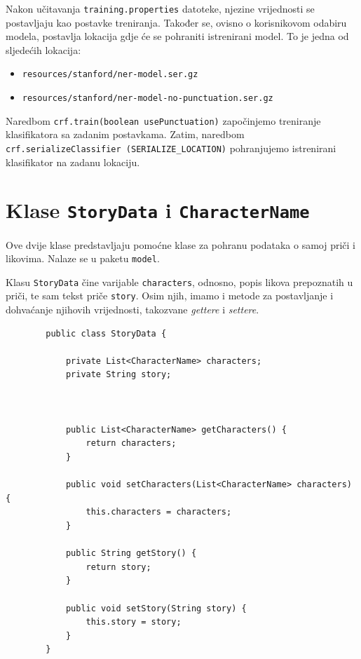 \documentclass[a4paper,twoside,12pt]{memoir} %
\newcommand{\ti}[1]{\textit{#1\/}}
\begin{document}
		Nakon učitavanja \texttt{training.properties} datoteke, njezine vrijednosti se postavljaju kao postavke treniranja. Također se, ovisno o korisnikovom odabiru modela, postavlja lokacija gdje će se pohraniti istrenirani model. To je jedna od sljedećih lokacija:
		\begin{itemize}
			\item 	 \texttt{resources/stanford/ner-model.ser.gz}
			\item 	 \texttt{resources/stanford/ner-model-no-punctuation.ser.gz}
		\end{itemize}

		Naredbom \texttt{crf.train(boolean usePunctuation)} započinjemo treniranje klasifikatora sa zadanim postavkama. Zatim, naredbom \texttt{crf.serializeClassifier (SERIALIZE\_LOCATION)} pohranjujemo istrenirani klasifikator na zadanu lokaciju.


	\section{Klase \texttt{StoryData} i \texttt{CharacterName}}

		Ove dvije klase predstavljaju pomoćne klase za pohranu podataka o samoj priči i likovima. Nalaze se u paketu \texttt{model}.

		Klasu \texttt{StoryData} čine varijable \texttt{characters}, odnosno, popis likova prepoznatih u priči, te sam tekst priče \texttt{story}. Osim njih, imamo i metode za postavljanje i dohvaćanje njihovih vrijednosti, takozvane \ti{gettere} i \ti{settere}.

		\begin{lstlisting}
		public class StoryData {

			private List<CharacterName> characters;
			private String story;



			public List<CharacterName> getCharacters() {
				return characters;
			}

			public void setCharacters(List<CharacterName> characters) {
				this.characters = characters;
			}

			public String getStory() {
				return story;
			}

			public void setStory(String story) {
				this.story = story;
			}
		}
		\end{lstlisting}
\end{document}
